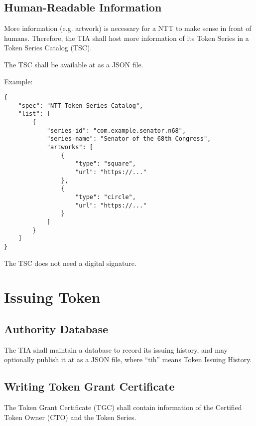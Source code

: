\subsection{Human-Readable Information}

More information (e.g. artwork) is necessary for a NTT to make sense in front of humans.
Therefore, the TIA shall host more information of its Token Series in a Token Series Catalog (TSC).

The TSC shall be available at  as a JSON file.

Example:\pagebreak

\begin{lstlisting}
{
    "spec": "NTT-Token-Series-Catalog",
    "list": [
        {
            "series-id": "com.example.senator.n68",
            "series-name": "Senator of the 68th Congress",
            "artworks": [
                {
                    "type": "square",
                    "url": "https://..."
                },
                {
                    "type": "circle",
                    "url": "https://..."
                }
            ]
        }
    ]
}
\end{lstlisting}

The TSC does not need a digital signature.











\section{Issuing Token}


\subsection{Authority Database}

The TIA shall maintain a database to record its issuing history,
and may optionally publish it at  as a JSON file, where ``tih'' means Token Issuing History.


\subsection{Writing Token Grant Certificate}

The Token Grant Certificate (TGC) shall contain information of the Certified Token Owner (CTO) and the Token Series.

